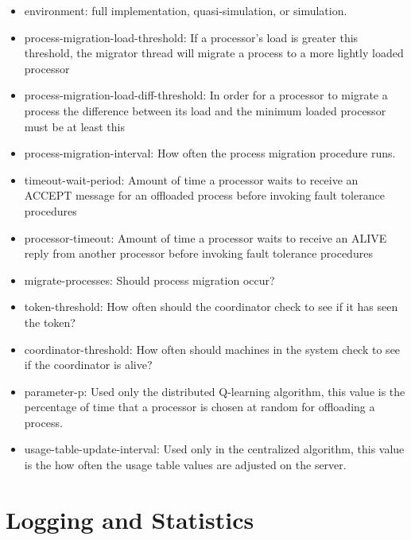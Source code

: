 \documentclass{report}
\begin{document}
\begin{itemize}
	\item environment: full implementation, quasi-simulation, or
	simulation. 

	\item process-migration-load-threshold: If a processor's load is
	greater this threshold, the migrator thread will migrate a process
	to a more lightly loaded processor

	\item process-migration-load-diff-threshold: In order for a
	processor to migrate a process the difference between its load and
	the minimum loaded processor must be at least this 

	\item process-migration-interval: How often the process migration
	procedure runs. 

	\item timeout-wait-period: Amount of time a processor waits to
	receive an ACCEPT message for an offloaded process before invoking
	fault tolerance procedures 

	\item processor-timeout: Amount of time a processor waits to receive
	an ALIVE reply from another processor before invoking fault
	tolerance procedures 

	\item migrate-processes: Should process migration occur?

	\item token-threshold: How often should the coordinator check to see
	if it has seen the token? 

	\item coordinator-threshold: How often should machines in the system
	check to see if the coordinator is alive?

	\item parameter-p: Used only the distributed Q-learning algorithm,
	this value is the percentage of time that a processor is chosen at
	random for offloading a process.

	\item usage-table-update-interval: Used only in the centralized
	algorithm, this value is the how often the usage table values are
	adjusted on the server.
\end{itemize}



\section{Logging and Statistics}
\end{document}
